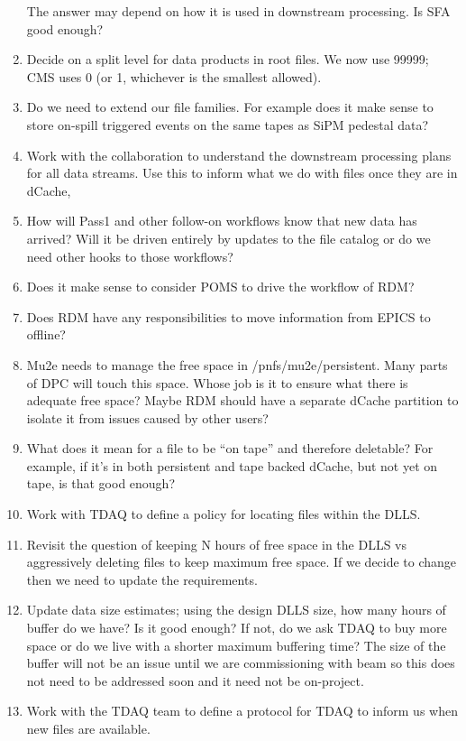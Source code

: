 \begin{enumerate}
    The answer may depend on how it is used in downstream processing.  Is SFA good enough?
  \item Decide on a split level for data products in \art root files.  We now use 99999; CMS uses 0 (or 1, whichever is the smallest allowed).
  \item Do we need to extend our file families.  For example does it make sense to store on-spill triggered events on the same tapes as SiPM pedestal data?
  \item Work with the collaboration to understand the downstream processing plans for all data streams.  Use this to inform what we do with
    files once they are in dCache,

  \item How will Pass1 and other follow-on workflows know that new data has arrived?
    Will it be driven entirely by updates to the file catalog or do we need other
    hooks to those workflows?
  \item Does it make sense to consider POMS to drive the workflow of RDM?
  \item Does RDM have any responsibilities to move information from EPICS to offline?
  \item Mu2e needs to manage the free space in /pnfs/mu2e/persistent. Many parts of DPC will touch this space.
    Whose job is it to ensure what there is adequate free space? Maybe RDM should have a separate dCache
    partition to isolate it from issues caused by other users?
  \item What does it mean for a file to be ``on tape'' and therefore deletable?
    For example, if it's in both persistent and tape backed dCache, but not yet on tape, is that good enough?
  \item Work with TDAQ to define a policy for locating files within the DLLS.
  \item Revisit the question of keeping N hours of free space in the DLLS vs aggressively deleting files to keep
    maximum free space.  If we decide to change then we need to update the requirements.
  \item Update data size estimates; using the design DLLS size, how many hours of buffer do we have?  Is it good enough?
    If not, do we ask TDAQ to buy more space or do we live with a shorter maximum buffering time?
    The size of the buffer will not be an issue until we are commissioning with beam so this does not need to
    be addressed soon and it need not be on-project.
  \item Work with the TDAQ team to define a protocol for TDAQ to inform us when new files are available.

\end{enumerate}
